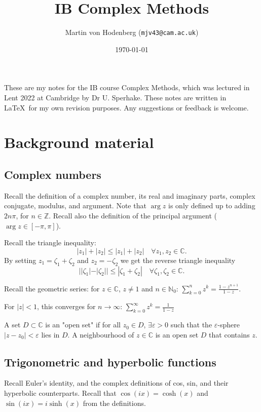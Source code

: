 \documentclass[a4paper]{scrartcl}
\title{IB Complex Methods}
\author{Martin von Hodenberg (\texttt{mjv43@cam.ac.uk})}
\date{\today}
\begin{document}
\maketitle

These are my notes for the IB course Complex Methods, which was lectured in Lent 2022 at Cambridge by Dr U. Sperhake. These notes are written in \LaTeX  \ for my own revision purposes. Any suggestions or feedback is welcome.



\tableofcontents
\newpage

\section{Background material}
\subsection{Complex numbers}
Recall the definition of a complex number, its real and imaginary parts, complex conjugate, modulus, and argument. Note that $\operatorname{arg} z$ is only defined up to adding $2n \pi$, for $n \in \mathbb{Z}$. Recall also the definition of the principal argument ($\operatorname{arg}z \in [- \pi, \pi]$). 

Recall the triangle inequality: \[
|z_1 |+|z_2 | \leq |z_1 |+ |z_2 | \quad \forall z_1 , z_2 \in \mathbb{C}
.\] 
By setting $z_1 = \zeta_1 +\zeta_2 $ and $z_2 =-\zeta_2 $ we get the reverse triangle inequality \[
||\zeta_1 |- |\zeta_2 ||\leq |\zeta_1 +\zeta_2 | \quad \forall \zeta_1 , \zeta_2 \in \mathbb{C}
.\] 

Recall the geometric series: for $z \in \mathbb{C}$, $z \neq 1$ and $n \in \mathbb{N}_0$: $\sum_{k=0}^{n}z^{k}= \frac{1-z^{n+1}}{1-z}$. 

For $|z|<1$, this converges for $n \rightarrow \infty$: $\sum_{k=0}^{ \infty}z^{k}= \frac{1}{1-z}$

\begin{definition}
     A set $D \subset \mathbb{C}$ is an "open set" if for all $z_0 \in D$, $\exists \varepsilon>0$ such that the $\varepsilon$-sphere $|z-z_0 |<\varepsilon$ lies in $D$. A neighbourhood of $z \in \mathbb{C}$ is an open set $D$ that contains $z$. 
\end{definition}

\subsection{Trigonometric and hyperbolic functions}
Recall Euler's identity, and the complex definitions of cos, sin, and their hyperbolic counterparts. Recall that $\cos (ix)=\cosh (x)$  and $\sin (ix)= i \sinh (x)$ from the definitions.
\end{document}
